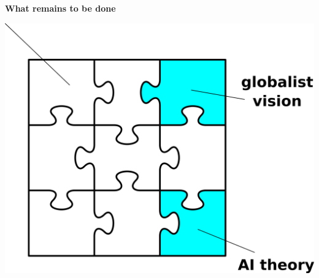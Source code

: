\documentclass[10pt]{beamer}
\begin{document}
\begin{frame}
\vspace*{2em}
{\color{blue} \Huge \textbf{What remains to be done}}

\vspace{0.5em}
\hspace*{5em}\includegraphics[scale=0.4]{jigsaw-puzzle.png}
\end{frame}
\end{document}
